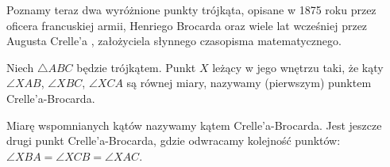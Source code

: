 %

Poznamy teraz dwa wyróżnione punkty trójkąta, opisane w 1875 roku przez oficera francuskiej armii, Henriego Brocarda oraz wiele lat wcześniej przez Augusta Crelle'a \cite{crelle_1816}, założyciela słynnego czasopisma matematycznego.
%
%

\begin{definition}
\label{punkty_brocarda}%
    Niech $\triangle ABC$ będzie trójkątem.
    Punkt $X$ leżący w jego wnętrzu taki, że kąty $\angle XAB$, $\angle XBC$, $\angle XCA$ są równej miary, nazywamy (pierwszym) punktem Crelle'a-Brocarda.
    \begin{center}
\begin{comment}
    \begin{tikzpicture}[scale=.75]
        \tkzInit[xmin=-0.5,xmax=6.5, ymin=-0.5,ymax=4.5]
        \tkzClip
        \tkzDefPoint(0, 0){A}
        \tkzDefPoint(6, 1){B}
        \tkzDefPoint(1.5, 4){C}
        \tkzLabelPoint[below left](A){$A$}
        \tkzLabelPoint[right](B){$B$}
        \tkzLabelPoint[above](C){$C$}

        \tkzDefLine[mediator](A,B) \tkzGetPoints{AB1}{AB2}
        \tkzDefLine[orthogonal=through B](B,C) \tkzGetPoint{BC3}
        \tkzInterLL(AB1,AB2)(B,BC3) \tkzGetPoint{S1}
        \tkzDefLine[mediator](B,C) \tkzGetPoints{BC1}{BC2}
        \tkzDefLine[orthogonal=through C](A,C) \tkzGetPoint{AC3}
        \tkzInterLL(BC1,BC2)(C,AC3) \tkzGetPoint{S2}
        \tkzInterCC(S1,B)(S2,C) \tkzGetPoints{Bro1}{Bro2} %
        \tkzLabelPoint[above right](Bro1){$X$}
        \tkzDrawSegments[line width=0.2mm](A,Bro1 B,Bro1 C,Bro1)
        \tkzFillAngle[fill=black!30,size=1](B,A,Bro1)
        \tkzFillAngle[fill=black!30,size=1](C,B,Bro1)
        \tkzFillAngle[fill=black!30,size=1](A,C,Bro1)
        \tkzDrawPolygon[line width=0.4mm](A,B,C)
        \tkzDrawPoints[size=3,color=black,fill=black!50](Bro1)
    \end{tikzpicture}
\end{comment}
    \end{center}
\end{definition}

Miarę wspomnianych kątów nazywamy kątem Crelle'a-Brocarda.
%
Jest jeszcze drugi punkt Crelle'a-Brocarda, gdzie odwracamy kolejność punktów: $\angle XBA = \angle XCB = \angle XAC$.

